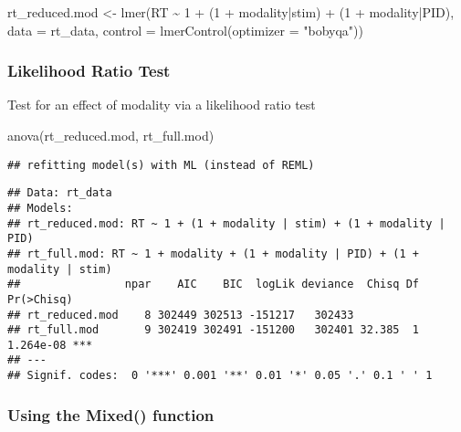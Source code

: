 \documentclass[
]{article}
\newenvironment{Shaded}{\begin{snugshade}}{\end{snugshade}}
\newcommand{\AttributeTok}[1]{\textcolor[rgb]{0.77,0.63,0.00}{#1}}
\newcommand{\DecValTok}[1]{\textcolor[rgb]{0.00,0.00,0.81}{#1}}
\newcommand{\FunctionTok}[1]{\textcolor[rgb]{0.00,0.00,0.00}{#1}}
\newcommand{\NormalTok}[1]{#1}
\newcommand{\OtherTok}[1]{\textcolor[rgb]{0.56,0.35,0.01}{#1}}
\newcommand{\SpecialCharTok}[1]{\textcolor[rgb]{0.00,0.00,0.00}{#1}}
\newcommand{\StringTok}[1]{\textcolor[rgb]{0.31,0.60,0.02}{#1}}
\begin{document}
\begin{Shaded}
\begin{Highlighting}[]
\NormalTok{rt\_reduced.mod }\OtherTok{\textless{}{-}} \FunctionTok{lmer}\NormalTok{(RT }\SpecialCharTok{\textasciitilde{}} \DecValTok{1} \SpecialCharTok{+} 
\NormalTok{                         (}\DecValTok{1} \SpecialCharTok{+}\NormalTok{ modality}\SpecialCharTok{|}\NormalTok{stim) }\SpecialCharTok{+}\NormalTok{ (}\DecValTok{1} \SpecialCharTok{+}\NormalTok{ modality}\SpecialCharTok{|}\NormalTok{PID), }
                       \AttributeTok{data =}\NormalTok{ rt\_data, }
                       \AttributeTok{control =} \FunctionTok{lmerControl}\NormalTok{(}\AttributeTok{optimizer =} \StringTok{"bobyqa"}\NormalTok{))}
\end{Highlighting}
\end{Shaded}

\hypertarget{likelihood-ratio-test}{%
\subsubsection{Likelihood Ratio Test}\label{likelihood-ratio-test}}

Test for an effect of modality via a likelihood ratio test

\begin{Shaded}
\begin{Highlighting}[]
\FunctionTok{anova}\NormalTok{(rt\_reduced.mod, rt\_full.mod)}
\end{Highlighting}
\end{Shaded}

\begin{verbatim}
## refitting model(s) with ML (instead of REML)
\end{verbatim}

\begin{verbatim}
## Data: rt_data
## Models:
## rt_reduced.mod: RT ~ 1 + (1 + modality | stim) + (1 + modality | PID)
## rt_full.mod: RT ~ 1 + modality + (1 + modality | PID) + (1 + modality | stim)
##                npar    AIC    BIC  logLik deviance  Chisq Df Pr(>Chisq)    
## rt_reduced.mod    8 302449 302513 -151217   302433                         
## rt_full.mod       9 302419 302491 -151200   302401 32.385  1  1.264e-08 ***
## ---
## Signif. codes:  0 '***' 0.001 '**' 0.01 '*' 0.05 '.' 0.1 ' ' 1
\end{verbatim}

\hypertarget{using-the-mixed-function}{%
\subsubsection{Using the Mixed()
function}\label{using-the-mixed-function}}
\end{document}
